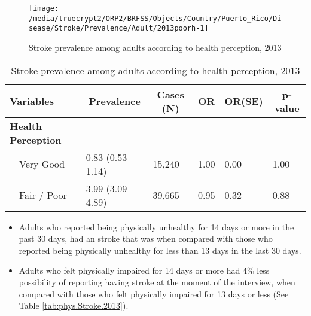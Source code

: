 \begin{figure}[H]
\caption{Stroke prevalence among adults according to health perception,
         2013}
\label{fig:fairpoor.Stroke.2013}

\begin{knitrout}
\color{fgcolor}

{\centering \texttt{[image: /media/truecrypt2/ORP2/BRFSS/Objects/Country/Puerto\_Rico/Disease/Stroke/Prevalence/Adult/2013poorh-1]} 

}



\end{knitrout}
 \end{figure}

\begin{table}[H]
\caption{Stroke prevalence  among adults according to health perception, 2013\label{tab:fairpoor.Stroke.2013}} 
\begin{center}
\begin{tabular}{llllll}
\hline\hline
\multicolumn{1}{l}{Variables}&\multicolumn{1}{c}{Prevalence}&\multicolumn{1}{c}{Cases (N)}&\multicolumn{1}{c}{OR}&\multicolumn{1}{c}{OR(SE)}&\multicolumn{1}{c}{p-value}\tabularnewline
\hline
{\bfseries Health Perception}&&&&&\tabularnewline
~~Very Good&0.83 (0.53-1.14)&15,240&1.00&0.00&1.00\tabularnewline
~~Fair / Poor&3.99 (3.09-4.89)&39,665&0.95&0.32&0.88\tabularnewline
\hline
\end{tabular}\end{center}

\end{table}

 
\newpage

 \newpage
\begin{itemize}

\item Adults who reported being physically unhealthy for 14 days or more in the past 30 days, had an stroke that was 
 when compared with 
those who reported being physically unhealthy for less than 13 days in the last 30 days.


\item Adults who felt physically impaired for 14 days or more had 4\% less possibility of reporting having stroke at the moment of the interview, when compared with those who felt physically impaired for 13 days or less (See Table \ref{tab:phys.Stroke.2013}).

\end{itemize}

